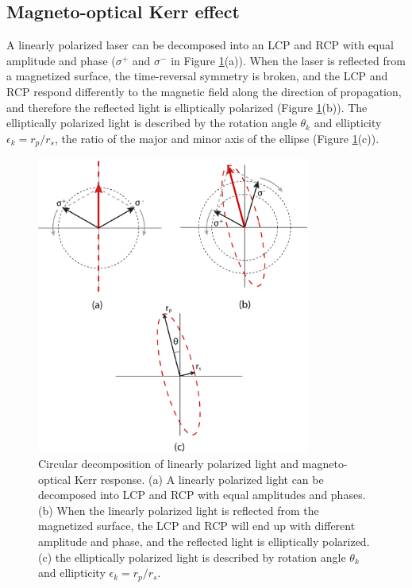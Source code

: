 \documentclass[pdflatex, sectionletters, 12pt]{pittetd}    %
\begin{document}
\subsection{Magneto-optical Kerr effect}

A linearly polarized laser can be decomposed into an LCP and RCP with equal amplitude and phase ($\sigma^+$ and $\sigma^-$ in Figure \ref{FIG:CircularDecompose}(a)). When the laser is reflected from a magnetized surface, the time-reversal symmetry is broken, and the LCP and RCP respond differently to the magnetic field along the direction of propagation, and therefore the reflected light is elliptically polarized (Figure \ref{FIG:CircularDecompose}(b)). The elliptically polarized light is described by the rotation angle $\theta_k$ and ellipticity $\epsilon_k = r_p/r_s$, the ratio of the major and minor axis of the ellipse (Figure \ref{FIG:CircularDecompose}(c)).
\\

\begin{figure}[p]
	\centering
	\includegraphics[width=0.8\textwidth]{Drawing/CircularDecompose.pdf}
	\caption{Circular decomposition of linearly polarized light and magneto-optical Kerr response. (a) A linearly polarized light can be decomposed into LCP and RCP with equal amplitudes and phases. (b) When the linearly polarized light is reflected from the magnetized surface, the LCP and RCP will end up with different amplitude and phase, and the reflected light is elliptically polarized. (c) the elliptically polarized light is described by rotation angle $\theta_k$ and ellipticity $\epsilon_k = r_p/r_s$.}
	\label{FIG:CircularDecompose}
\end{figure}
\end{document}
